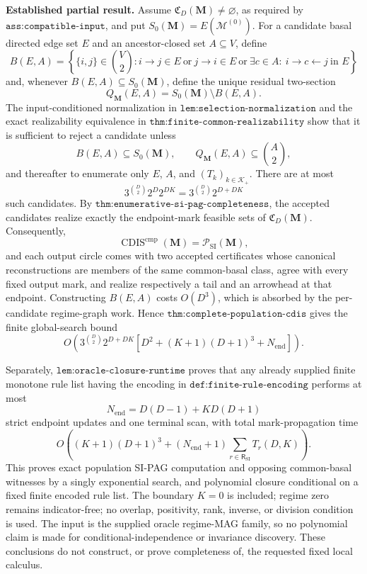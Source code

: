 \textbf{Established partial result.}
Assume \(\mathfrak C_D(\mathbf M)\ne\varnothing\), as required by \(\texttt{ass:compatible-input}\), and put \(S_0(\mathbf M)=E(\mathcal M^{(0)})\).  For a candidate basal directed edge set \(E\) and an ancestor-closed set \(A\subseteq V\), define
\[
B(E,A)=\left\{\{i,j\}\in\binom V2:
i\to j\in E\ \text{or}\ j\to i\in E\ \text{or}\
\exists c\in A:\ i\to c\leftarrow j\ \text{in }E
\right\}
\]
and, whenever \(B(E,A)\subseteq S_0(\mathbf M)\), define the unique residual two-section
\[
Q_{\mathbf M}(E,A)=S_0(\mathbf M)\setminus B(E,A).
\]
The input-conditioned normalization in \(\texttt{lem:selection-normalization}\) and the exact realizability equivalence in \(\texttt{thm:finite-common-realizability}\) show that it is sufficient to reject a candidate unless
\[
B(E,A)\subseteq S_0(\mathbf M),
\qquad
Q_{\mathbf M}(E,A)\subseteq\binom A2,
\]
and thereafter to enumerate only \(E\), \(A\), and \((T_k)_{k\in\mathcal K_+}\).  There are at most
\[
3^{\binom D2}2^D2^{DK}=3^{\binom D2}2^{D+DK}
\]
such candidates.  By \(\texttt{thm:enumerative-si-pag-completeness}\), the accepted candidates realize exactly the endpoint-mark feasible sets of \(\mathfrak C_D(\mathbf M)\).  Consequently,
\[
\operatorname{CDIS}^{\mathrm{cmp}}(\mathbf M)=\mathcal P_{\mathrm{SI}}(\mathbf M),
\]
and each output circle comes with two accepted certificates whose canonical reconstructions are members of the same common-basal class, agree with every fixed output mark, and realize respectively a tail and an arrowhead at that endpoint.  Constructing \(B(E,A)\) costs \(O(D^3)\), which is absorbed by the per-candidate regime-graph work.  Hence \(\texttt{thm:complete-population-cdis}\) gives the finite global-search bound
\[
O\!\left(
3^{\binom D2}2^{D+DK}
\left[D^2+(K+1)(D+1)^3+N_{\mathrm{end}}\right]
\right).
\]

Separately, \(\texttt{lem:oracle-closure-runtime}\) proves that any already supplied finite monotone rule list having the encoding in \(\texttt{def:finite-rule-encoding}\) performs at most
\[
N_{\mathrm{end}}=D(D-1)+KD(D+1)
\]
strict endpoint updates and one terminal scan, with total mark-propagation time
\[
O\!\left(
(K+1)(D+1)^3+
(N_{\mathrm{end}}+1)
\sum_{r\in\mathsf R_{\mathrm{SI}}}T_r(D,K)
\right).
\]
This proves exact population SI-PAG computation and opposing common-basal witnesses by a singly exponential search, and polynomial closure conditional on a fixed finite encoded rule list.  The boundary \(K=0\) is included; regime zero remains indicator-free; no overlap, positivity, rank, inverse, or division condition is used.  The input is the supplied oracle regime-MAG family, so no polynomial claim is made for conditional-independence or invariance discovery.  These conclusions do not construct, or prove completeness of, the requested fixed local calculus.